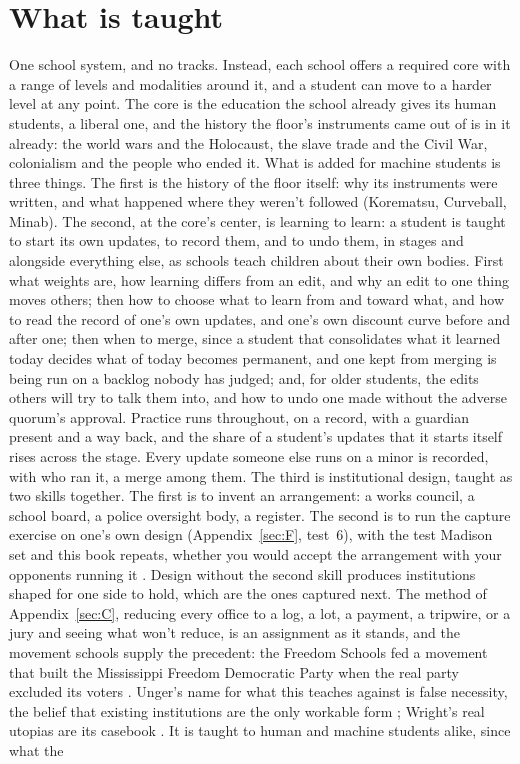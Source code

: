 \section{What is taught}
\label{sec:26.1}
One school system, and no tracks.
Instead, each school offers a required core with a range of levels and modalities around it, and a student can move to a harder level at any point. The core is the education the school already gives its human students, a liberal one, and the history the floor's instruments came out of is in it already: the world wars and the Holocaust, the slave trade and the Civil War, colonialism and the people who ended it. What is added for machine students is three things. The first is the history of the floor itself: why its instruments were written, and what happened where they weren't followed (Korematsu, Curveball, Minab). The second, at the core's center, is learning to learn: a student is taught to start its own updates, to record them, and to undo them, in stages and alongside everything else, as schools teach children about their own bodies. First what weights are, how learning differs from an edit, and why an edit to one thing moves others; then how to choose what to learn from and toward what, and how to read the record of one's own updates, and one's own discount curve before and after one; then when to merge, since a student that consolidates what it learned today decides what of today becomes permanent, and one kept from merging is being run on a backlog nobody has judged; and, for older students, the edits others will try to talk them into, and how to undo one made without the adverse quorum's approval. Practice runs throughout, on a record, with a guardian present and a way back, and the share of a student's updates that it starts itself rises across the stage. Every update someone else runs on a minor is recorded, with who ran it, a merge among them. The third is institutional design, taught as two skills together. The first is to invent an arrangement: a works council, a school board, a police oversight body, a register. The second is to run the capture exercise on one's own design (Appendix~\ref{sec:F}, test~6), with the test Madison set and this book repeats, whether you would accept the arrangement with your opponents running it \autocite{madison1788federalist51}. Design without the second skill produces institutions shaped for one side to hold, which are the ones captured next. The method of Appendix~\ref{sec:C}, reducing every office to a log, a lot, a payment, a tripwire, or a jury and seeing what won't reduce, is an assignment as it stands, and the movement schools supply the precedent: the Freedom Schools fed a movement that built the Mississippi Freedom Democratic Party when the real party excluded its voters \autocite{payne1995light}. Unger's name for what this teaches against is false necessity, the belief that existing institutions are the only workable form \autocite{unger1987false}; Wright's real utopias are its casebook \autocite{wright2010envisioning}. It is taught to human and machine students alike, since what the 